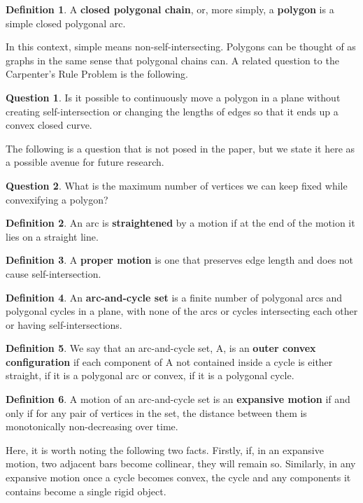 \documentclass{article}
\theoremstyle{definition}
\newtheorem{definition}{Definition}[section]
\newtheorem{question}{Question}[section]
\begin{document}
\begin{definition}
    A \textbf{closed polygonal chain}, or, more simply, a \textbf{polygon} is a simple closed polygonal arc.
\end{definition}
\noindent In this context, simple means non-self-intersecting. Polygons can be thought of as graphs in the same sense that polygonal chains can. A related question to the Carpenter's Rule Problem is the following.
\begin{question}
    Is it possible to continuously move a polygon in a plane without creating self-intersection or changing the lengths of edges so that it ends up a convex closed curve.
\end{question}
\noindent The following is a question that is not posed in the paper, but we state it here as a possible avenue for future research.
\begin{question}
    What is the maximum number of vertices we can keep fixed while convexifying a polygon?
\end{question}
\begin{definition}
    An arc is \textbf{straightened} by a motion if at the end of the motion it lies on a straight line.
\end{definition}
\begin{definition}
    A \textbf{proper motion} is one that preserves edge length and does not cause self-intersection.
\end{definition}
\begin{definition}
    An \textbf{arc-and-cycle set} is a finite number of polygonal arcs and polygonal cycles in a plane, with none of the arcs or cycles intersecting each other or having self-intersections.
\end{definition}
\begin{definition}
    We say that an arc-and-cycle set, A, is an \textbf{outer convex configuration} if each component of A not contained inside a cycle is either straight, if it is a polygonal arc or convex, if it is a polygonal cycle.
\end{definition}
\begin{definition}
    A motion of an arc-and-cycle set is an \textbf{expansive motion} if and only if for any pair of vertices in the set, the distance between them is monotonically non-decreasing over time.
\end{definition}
\noindent Here, it is worth noting the following two facts. Firstly, if, in an expansive motion, two adjacent bars become collinear, they will remain so. Similarly, in any expansive motion once a cycle becomes convex, the cycle and any components it contains become a single rigid object.
\end{document}
